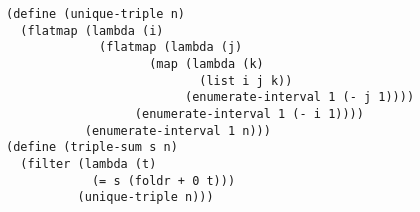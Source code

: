 \documentclass[a4paper,12pt]{article}
\begin{document}
\begin{lstlisting}
(define (unique-triple n)
  (flatmap (lambda (i)
             (flatmap (lambda (j)
                    (map (lambda (k)
                           (list i j k))
                         (enumerate-interval 1 (- j 1))))
                  (enumerate-interval 1 (- i 1))))
           (enumerate-interval 1 n)))
(define (triple-sum s n)
  (filter (lambda (t)
            (= s (foldr + 0 t)))
          (unique-triple n)))
\end{lstlisting}
\end{document}
